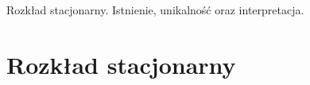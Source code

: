 {
\makeatletter
{}
\makeatother
\graphicspath{{../probabil}}

\begin{questiontext}
	Rozkład stacjonarny. Istnienie, unikalność oraz interpretacja.
\end{questiontext}

\section{Rozkład stacjonarny}
 {
 }
}